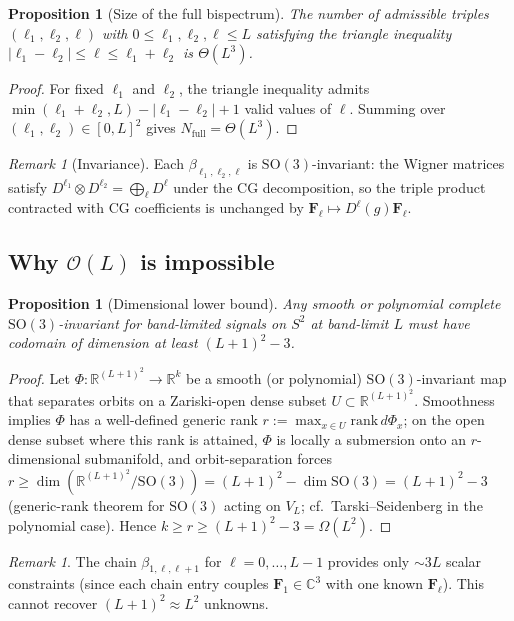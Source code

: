 \documentclass{article}
\newtheorem{proposition}[theorem]{Proposition}
\theoremstyle{definition}
\theoremstyle{remark}
\newtheorem{remark}[theorem]{Remark}
\newcommand{\R}{\mathbb{R}}
\newcommand{\C}{\mathbb{C}}
\newcommand{\SO}{\mathrm{SO}}
\theoremstyle{definition}
\begin{document}
\begin{proposition}[Size of the full bispectrum]\label{prop:app-full-size}
The number of admissible triples $(\ell_1, \ell_2, \ell)$ with
$0 \le \ell_1, \ell_2, \ell \le L$ satisfying the triangle inequality
$|\ell_1 - \ell_2| \le \ell \le \ell_1 + \ell_2$ is $\Theta(L^3)$.
\end{proposition}
\begin{proof}
For fixed $\ell_1$ and $\ell_2$, the triangle inequality admits
$\min(\ell_1 + \ell_2, L) - |\ell_1 - \ell_2| + 1$ valid values of
$\ell$. Summing over $(\ell_1,\ell_2)\in[0,L]^2$ gives
$N_{\mathrm{full}} = \Theta(L^3)$.
\end{proof}

\begin{remark}[Invariance]
Each $\beta_{\ell_1,\ell_2,\ell}$ is $\SO(3)$-invariant: the Wigner
matrices satisfy $D^{\ell_1} \otimes D^{\ell_2}
= \bigoplus_\ell D^\ell$ under the CG decomposition, so the triple
product contracted with CG coefficients is unchanged by
$\mathbf{F}_\ell \mapsto D^\ell(g)\mathbf{F}_\ell$.
\end{remark}

\subsection{Why $\mathcal{O}(L)$ is impossible}
\label{sec:app-lower-bound}

\begin{proposition}[Dimensional lower bound]\label{prop:app-lower-bound}
Any \emph{smooth or polynomial} complete $\SO(3)$-invariant for
band-limited signals on $S^2$ at band-limit $L$ must have codomain
of dimension at least $(L+1)^2 - 3$.
\end{proposition}
\begin{proof}
Let $\Phi : \R^{(L+1)^2} \to \R^k$ be a smooth (or polynomial)
$\SO(3)$-invariant map that separates orbits on a Zariski-open
dense subset $U\subset\R^{(L+1)^2}$. Smoothness implies $\Phi$ has a
well-defined generic rank $r := \max_{x\in U} \mathrm{rank}\,
d\Phi_x$; on the open dense subset where this rank is attained,
$\Phi$ is locally a submersion onto an $r$-dimensional submanifold,
and orbit-separation forces $r \ge \dim(\R^{(L+1)^2}/\SO(3))
= (L+1)^2 - \dim\SO(3) = (L+1)^2 - 3$
(generic-rank theorem for $\SO(3)$ acting on $V_L$;
cf.~Tarski--Seidenberg in the polynomial case). Hence
$k \ge r \ge (L+1)^2 - 3 = \Omega(L^2)$.
\end{proof}

\begin{remark}
The chain $\beta_{1,\ell,\ell+1}$ for $\ell = 0, \dotsc, L-1$ provides
only $\sim 3L$ scalar constraints (since each chain entry couples
$\mathbf{F}_1 \in \C^3$ with one known $\mathbf{F}_\ell$). This cannot
recover $(L+1)^2 \approx L^2$ unknowns.
\end{remark}
\end{document}
